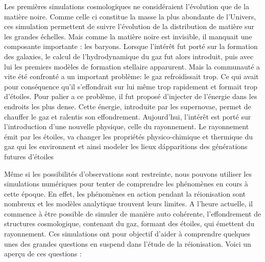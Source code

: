 Les premières simulations cosmologiques ne considéraient l'évolution que de la matière noire. %
Comme celle ci constitue la masse la plus abondante de l'Univers, ces simulation permettent de suivre l'évolution de la distribution de matière sur les grandes échelles. 
Mais comme la matière noire est invisible, il manquait une composante importante : les baryons.
Lorsque l'intérêt fut porté sur la formation des galaxies, le calcul de l'hydrodynamique du gaz fut alors introduit, puis avec lui les premiers modèles de formation stellaire apparurent.
Mais la communauté a vite été confronté a un important problème: le gaz refroidissait trop.
Ce qui avait pour conséquence qu'il s'effondrait sur lui même trop rapidement et formait trop d'étoiles.
Pour palier a ce problème, il fut proposé d'injecter de l'énergie dans les endroits les plus dense.
Cette énergie, introduite par les supernovae, permet de chauffer le gaz et ralentis son effondrement. 
Aujourd'hui, l'intérêt est porté sur l'introduction d'une nouvelle physique, celle du rayonnement.
Le rayonnement émit par les étoiles, va changer les propriétés physico-chimique et thermique du gaz qui les environnent et ainsi modeler les lieux d\'apparitions des générations futures d'étoiles

Même si les possibilités d'observations sont restreinte, nous pouvons utiliser les simulations numériques pour tenter de comprendre les phénomènes en cours à cette époque.
En effet, les phénomènes en action pendant la réionisation sont nombreux et les modèles analytique trouvent leurs limites.
A l'heure actuelle, il commence à être possible de simuler de manière auto cohérente, l'effondrement de structures cosmologique, contenant du gaz, formant des étoiles, qui émettent du rayonnement.
Ces simulations ont pour objectif d'aider à comprendre quelques unes des grandes questions en suspend dans l'étude de la réionisation.
Voici un aperçu de ces questions : 

